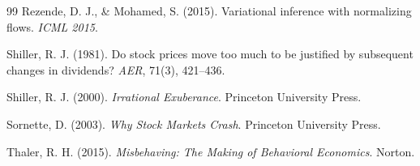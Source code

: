 \documentclass[12pt,a4paper]{article}
\theoremstyle{definition}
\begin{document}
\begin{thebibliography}{99}
Rezende, D. J., \& Mohamed, S. (2015). Variational inference with normalizing flows. \textit{ICML 2015}.

Shiller, R. J. (1981). Do stock prices move too much to be justified by subsequent changes in dividends? \textit{AER}, 71(3), 421--436.

Shiller, R. J. (2000). \textit{Irrational Exuberance}. Princeton University Press.

Sornette, D. (2003). \textit{Why Stock Markets Crash}. Princeton University Press.

Thaler, R. H. (2015). \textit{Misbehaving: The Making of Behavioral Economics}. Norton.

\end{thebibliography}
\end{document}
